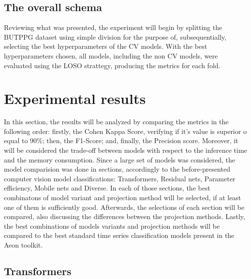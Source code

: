 \subsection{The overall schema}

Reviewing what was presented, the experiment will begin by splitting the \acrshort{BUTPPG} dataset using simple division for the purpose of, subsequentially, selecting the best hyperparameters of the \acrshort{CV} models. With the best hyperparameters chosen, all models, including the non \acrshort{CV} models, were evaluated using the \acrshort{LOSO} strattegy, producing the metrics for each fold.


\section{Experimental results}


In this section, the results will be analyzed by comparing the metrics in the following order: firstly, the Cohen Kappa Score, verifying if it's value is superior o equal to 90\%; then, the F1-Score; and, finally, the Precision score. Moreover, it will be considered the trade-off between models with respect to the inference time and the memory consumption. Since a large set of models was considered, the model comparision was done in sections, accordingly to the before-presented computer vision model classifications: Transformers, Residual nets, Parameter efficiency, Mobile nets and Diverse. In each of those sections, the best combinatons of model variant and projection method will be selected, if at least one of them is sufficiently good. Afterwards, the selections of each section will be compared, also discussing the differences between the projection methods. Lastly, the best combinations of models variants and projection methods will be compared to the best standard time series classification models present in the Aeon toolkit.

\pagebreak

\subsection{Transformers}



%





